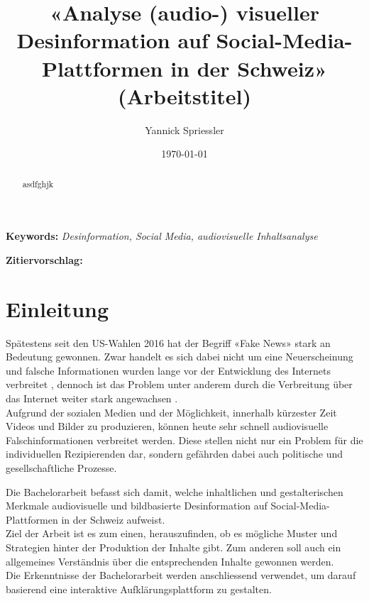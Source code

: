 \documentclass[12pt,a4paper]{article}        %
\title{«Analyse (audio-) visueller Desinformation auf Social-Media-Plattformen in der Schweiz» (Arbeitstitel)}        %
\author{Yannick Spriessler}     %
\date{\today}     %
\begin{document}
\begin{titlingpage} %
  
  \nocite{howard_trees_2017}  %
\end{titlingpage}
\pagebreak      %
\renewcommand{\abstractname}{Abstract}
\begin{abstract}
  \setlength{\parindent}{0pt}  
    asdfghjk \\
\end{abstract}

\textbf{Keywords:} \textit{Desinformation, Social Media, audiovisuelle Inhaltsanalyse}


\textbf{Zitiervorschlag:}
\linebreak
\pagebreak
\thispagestyle{empty}
\setcounter{page}{0}    %
\tableofcontents        %
\pagebreak

\section{Einleitung}
Spätestens seit den US-Wahlen 2016 hat der Begriff «Fake News» stark an Bedeutung gewonnen. Zwar handelt es sich dabei nicht um eine Neuerscheinung und falsche Informationen wurden lange vor der Entwicklung des Internets verbreitet \parencites[214]{allcott_social_2017}[247]{hohlfeld_schlechte_2020}[1]{khan_fake_2021}, dennoch ist das Problem unter anderem durch die Verbreitung über das Internet weiter stark angewachsen \parencites[214–215]{allcott_social_2017}[1]{khan_fake_2021}[1]{lazer_science_2018}[4]{ceron_fake_2021}. \\
Aufgrund der sozialen Medien und der Möglichkeit, innerhalb kürzester Zeit Videos und Bilder zu produzieren, können heute sehr schnell audiovisuelle Falschinformationen verbreitet werden. Diese stellen nicht nur ein Problem für die individuellen Rezipierenden dar, sondern gefährden dabei auch politische und gesellschaftliche Prozesse.

Die Bachelorarbeit befasst sich damit, welche inhaltlichen und gestalterischen Merkmale audiovisuelle und bildbasierte Desinformation auf Social-Media-Plattformen in der Schweiz aufweist. \\
Ziel der Arbeit ist es zum einen, herauszufinden, ob es mögliche Muster und
Strategien hinter der Produktion der Inhalte gibt. Zum anderen soll auch ein
allgemeines Verständnis über die entsprechenden Inhalte gewonnen werden. \\
Die Erkenntnisse der Bachelorarbeit werden anschliessend verwendet, um darauf basierend eine interaktive Aufklärungsplattform zu gestalten.
\end{document}
